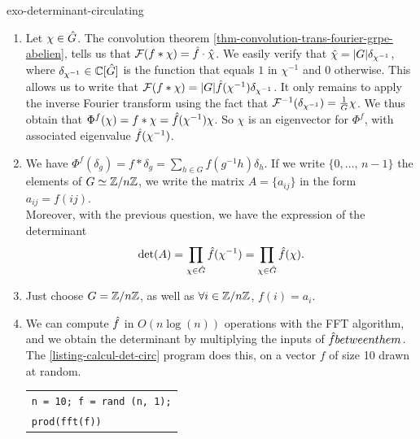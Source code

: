  
\begin{correction}{exo-determinant-circulating}
 \begin{enumerate}
\item Let $ \chi \in \hat{G} $. The convolution theorem \ref{thm-convolution-trans-fourier-grpe-abelien}, tells us that $ \mathcal{F}(f * \chi) = \hat{f} \cdot \hat{\chi} $. We easily verify that $ \hat{\chi} = |G| \delta_{\chi^{-1}} $, where $ \delta_{\chi^{-1}} \in \mathbb{C} [\hat{G}] $ is the function that equals $ 1 $ in $ \chi^{-1} $ and $ 0 $ otherwise. This allows us to write that $ \mathcal{F}(f * \chi) = |G| \hat{f} (\chi^{-1}) \delta_{\chi^{-1}} $. It only remains to apply the inverse Fourier transform using the fact that $ \mathcal{F}^{-1} (\delta_{\chi^{-1}}) = \tfrac{1}{G} \chi $. We thus obtain that $ \Phi^f(\chi) = f * \chi = \hat{f} (\chi^{-1}) \chi $. So $ \chi $ is an eigenvector for $ \Phi^f $, with associated eigenvalue $ \hat{f} (\chi^{-1}) $.
\item We have $ \Phi^f(\delta_g) = f * \delta_g = \sum_{h \in G}{f(g^{-1} h) \delta_{h}} $. If we write $ \{0, \ldots, \, n-1\} $ the elements of $ G \simeq \mathbb{Z}/n \mathbb{Z} $, we write the matrix $ A = \{a_{ij}\} $ in the form $ a_{ij} = f(ij) $. \\Moreover, with the previous question, we have the expression of the determinant
\begin{equation*}
\det (A) = \prod_{\chi \in \hat{G}}{\hat{f} (\chi^{-1})} = \prod_{\chi \in \hat{G}}{\hat{f} (\chi)}.
\end{equation*}
 
\item Just choose $ G = \mathbb{Z}/n \mathbb{Z} $, as well as $ \forall i \in \mathbb{Z}/n \mathbb{Z} $, $ f(i) = a_i $.
\item We can compute $ \hat{f} $ in $ O(n \log (n)) $ operations with the FFT algorithm, and we obtain the determinant by multiplying the inputs of $ \hat{f} between them $. The \Matlab{} \ref{listing-calcul-det-circ} program does this, on a vector $ f $ of size 10 drawn at random.
 
\begin{listing} \begin{footnotesize}
{\upshape
\begin{tabular}{l} \texttt{n = 10; f = rand (n, 1);} \\
\texttt{prod(fft(f))} \\
\end{tabular}
}
\end{footnotesize}
\caption{Calculation of circulating determinant}
\label{listing-calcul-det-circ}
\end{listing}
 
\end{enumerate}
\end{correction}
 
